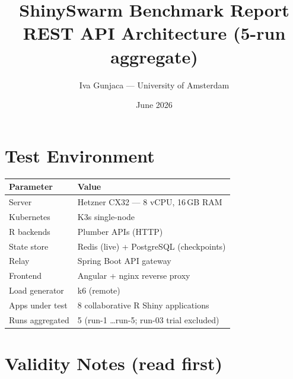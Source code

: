 \documentclass[11pt,a4paper]{article}
\title{ShinySwarm Benchmark Report\\[4pt]\large REST API Architecture (5-run aggregate)}
\author{Iva Gunjaca — University of Amsterdam}
\date{June 2026}
\begin{document}
\maketitle

\section{Test Environment}

\begin{tabular}{@{}ll@{}}
\toprule
\textbf{Parameter}       & \textbf{Value} \\
\midrule
Server                    & Hetzner CX32 — 8 vCPU, 16\,GB RAM \\
Kubernetes                & K3s single-node \\
R backends                & Plumber APIs (HTTP) \\
State store               & Redis (live) + PostgreSQL (checkpoints) \\
Relay                     & Spring Boot API gateway \\
Frontend                  & Angular + nginx reverse proxy \\
Load generator            & k6 (remote) \\
Apps under test           & 8 collaborative R Shiny applications \\
Runs aggregated           & 5 (run-1 \ldots run-5; run-03 trial excluded) \\
\bottomrule
\end{tabular}

\section*{Validity Notes (read first)}
\end{document}
